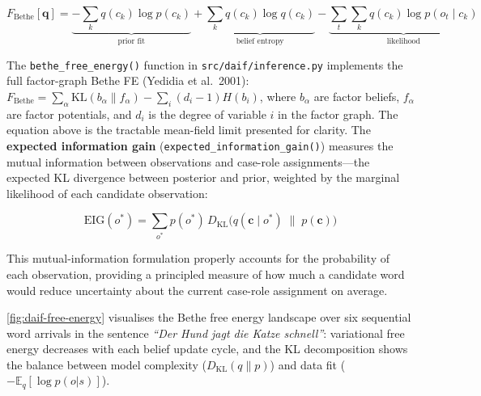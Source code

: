 \documentclass[
]{article}
\begin{document}
\begin{equation}
F_{\text{Bethe}}[\mathbf{q}] = \underbrace{-\sum_k q(c_k) \log p(c_k)}_{\text{prior fit}} + \underbrace{\sum_k q(c_k) \log q(c_k)}_{\text{belief entropy}} - \underbrace{\sum_t \sum_k q(c_k) \log p(o_t \mid c_k)}_{\text{likelihood}}
\label{eq:eq-7c-bethe}
\end{equation}

The \texttt{bethe\_free\_energy()} function in
\texttt{src/daif/inference.py} implements the full factor-graph Bethe FE
(Yedidia et al.~2001):
\(F_{\text{Bethe}} = \sum_\alpha \mathrm{KL}(b_\alpha \| f_\alpha) - \sum_i (d_i - 1) H(b_i)\),
where \(b_\alpha\) are factor beliefs, \(f_\alpha\) are factor
potentials, and \(d_i\) is the degree of variable \(i\) in the factor
graph. The equation above is the tractable mean-field limit presented
for clarity. The \textbf{expected information gain}
(\texttt{expected\_information\_gain()}) measures the mutual information
between observations and case-role assignments---the expected KL
divergence between posterior and prior, weighted by the marginal
likelihood of each candidate observation:

\begin{equation}
\text{EIG}(o^*) = \sum_{o^*} p(o^*) \, D_{\mathrm{KL}}\bigl(q(\mathbf{c} \mid o^*) \;\|\; p(\mathbf{c})\bigr)
\label{eq:eq-7c-eig}
\end{equation}

This mutual-information formulation properly accounts for the
probability of each observation, providing a principled measure of how
much a candidate word would reduce uncertainty about the current
case-role assignment on average.

\autoref{fig:daif-free-energy} visualises the Bethe free energy
landscape over six sequential word arrivals in the sentence \emph{``Der
Hund jagt die Katze schnell''}: variational free energy decreases with
each belief update cycle, and the KL decomposition shows the balance
between model complexity (\(D_{\mathrm{KL}}(q\|p)\)) and data fit
(\(-\mathbb{E}_q[\log p(o|s)]\)).
\end{document}

